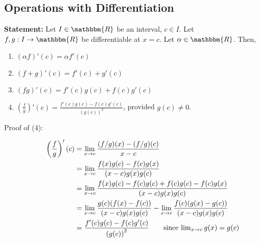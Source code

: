 \documentclass[10pt]{extarticle}
\newcommand{\R}{\mathbbm{R}}
\begin{document}
  \subsection{Operations with Differentiation}%
    \textbf{Statement:} Let $I\in\R$ be an interval, $c\in I$. Let $f,g: I\rightarrow \R$ be differentiable at $x=c$. Let $\alpha\in\R$. Then,
    \begin{enumerate}[(1)]
      \item $\displaystyle(\alpha f)'(c) = \alpha f'(c)$
      \item $\displaystyle(f+g)'(c) = f'(c) + g'(c)$
      \item $\displaystyle(fg)'(c) = f'(c)g(c) + f(c)g'(c)$
      \item $\displaystyle\left(\frac{f}{g}\right)'(c) = \frac{f'(c)g(c)-f(c)g'(c)}{\left(g(c)\right)^2}$, provided $g(c) \neq 0$.
    \end{enumerate}

    \begin{description}
      \item[Proof of (4):]
        \begin{align*}
          \left(\frac{f}{g}\right)'(c) &=\lim_{x\rightarrow c} \frac{(f/g)(x) - (f/g)(c)}{x-c}\\
                                       &= \lim_{x\rightarrow c} \frac{f(x)g(c) - f(c)g(x)}{(x-c)g(x)g(c)}\\
                                       &= \lim_{x\rightarrow c}\frac{f(x)g(c)-f(c)g(c) + f(c)g(c) - f(c)g(x)}{(x-c)g(x)g(c)}\\
                                       &= \lim_{x\rightarrow c}\frac{g(c)(f(x) - f(c))}{(x-c)g(x)g(c)} - \lim_{x\rightarrow c}\frac{f(c)(g(x) - g(c))}{(x-c)g(x)g(c)}\\
                                       &= \frac{f'(c)g(c) - f(c)g'(c)}{\left(g(c)\right)^2} \tag*{since $\lim_{x\rightarrow c}g(x) = g(c)$}
        \end{align*}
    \end{description}
\end{document}

